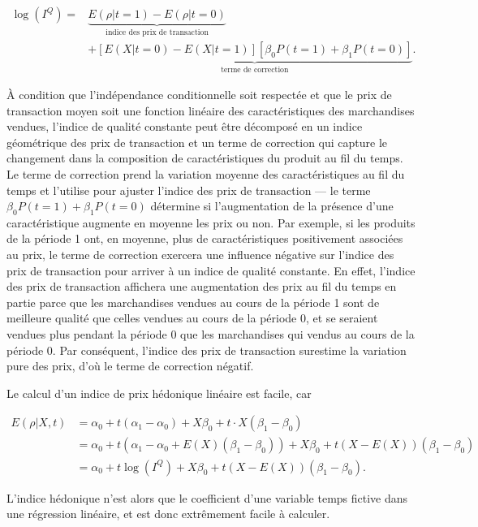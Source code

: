 \documentclass[
]{article}
\begin{document}
\begin{align*}
\log (I^{Q}) =& \underbrace{E(\rho | t = 1) - E(\rho | t = 0)}_{\text{indice des prix de transaction}} \\
& + \underbrace{[E(X | t = 0) - E(X | t = 1)] [\beta_{0} P (t = 1) + \beta_{1} P (t = 0)]}_{\text{terme de correction}}.
\end{align*}

À condition que l'indépendance conditionnelle soit respectée et que le prix de transaction moyen soit une fonction linéaire des caractéristiques des marchandises vendues, l'indice de qualité constante peut être décomposé en un indice géométrique des prix de transaction et un terme de correction qui capture le changement dans la composition de caractéristiques du produit au fil du temps. Le terme de correction prend la variation moyenne des caractéristiques au fil du temps et l'utilise pour ajuster l'indice des prix de transaction --- le terme \(\beta_{0} P(t = 1) + \beta_{1} P(t = 0)\) détermine si l'augmentation de la présence d'une caractéristique augmente en moyenne les prix ou non. Par exemple, si les produits de la période 1 ont, en moyenne, plus de caractéristiques positivement associées au prix, le terme de correction exercera une influence négative sur l'indice des prix de transaction pour arriver à un indice de qualité constante. En effet, l'indice des prix de transaction affichera une augmentation des prix au fil du temps en partie parce que les marchandises vendues au cours de la période 1 sont de meilleure qualité que celles vendues au cours de la période 0, et se seraient vendues plus pendant la période 0 que les marchandises qui vendus au cours de la période 0. Par conséquent, l'indice des prix de transaction surestime la variation pure des prix, d'où le terme de correction négatif.

Le calcul d'un indice de prix hédonique linéaire est facile, car

\begin{align*}
E(\rho | X, t) &= \alpha_{0} + t (\alpha_{1} - \alpha_{0}) + X \beta_{0} + t \cdot X (\beta_{1} - \beta_{0}) \\
&= \alpha_{0} + t (\alpha_{1} - \alpha_{0} + E(X) (\beta_{1} - \beta_{0})) + X \beta_{0} + t ( X - E(X)) (\beta_{1} - \beta_{0}) \\
&= \alpha_{0} + t \log (I^{Q}) + X \beta_{0} + t (X - E(X)) (\beta_{1} - \beta_{0}).
\end{align*}

L'indice hédonique n'est alors que le coefficient d'une variable temps fictive dans une régression linéaire, et est donc extrêmement facile à calculer.
\end{document}
